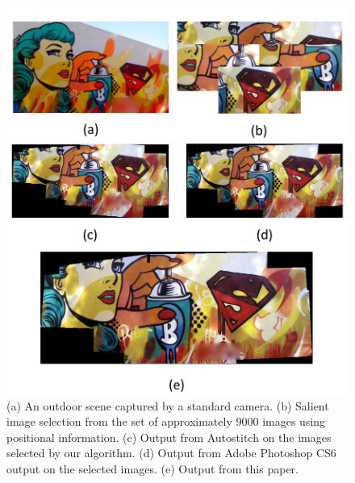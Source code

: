 \documentclass[10pt,twocolumn,letterpaper]{article}
\begin{document}
\begin{figure}[h!]
\centering
\includegraphics[width=0.87\linewidth]{figures/lady2.pdf}
\caption{ (a) An outdoor scene captured by a standard camera.  (b) Salient image selection from the set of
  approximately 9000 images using positional information. (c) Output from
  Autostitch \cite{autostitch} on the images selected by our algorithm. (d) Output from Adobe Photoshop CS6
  \cite{photoshop} output on the selected images. (e) Output from this paper.}
\label{fig:validResults}
\end{figure}


% 
% 
\vspace{5 mm}
\end{document}
